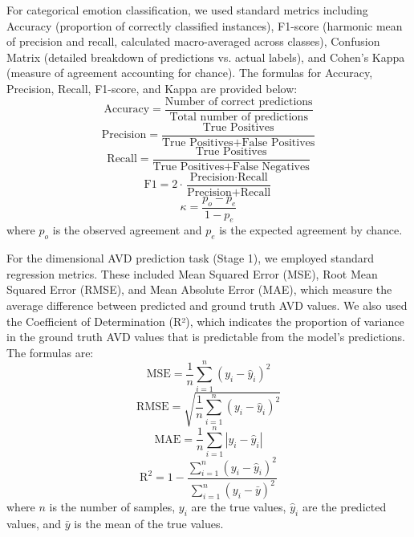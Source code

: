 \documentclass[12pt]{article}
\begin{document}
For categorical emotion classification, we used standard metrics including Accuracy (proportion of correctly classified instances), F1-score (harmonic mean of precision and recall, calculated macro-averaged across classes), Confusion Matrix (detailed breakdown of predictions vs. actual labels), and Cohen's Kappa (measure of agreement accounting for chance). The formulas for Accuracy, Precision, Recall, F1-score, and Kappa are provided below:
    \begin{equation}
        \text{Accuracy} = \frac{\text{Number of correct predictions}}{\text{Total number of predictions}}
    \end{equation}
    \begin{equation}
        \text{Precision} = \frac{\text{True Positives}}{\text{True Positives} + \text{False Positives}}
    \end{equation}
    \begin{equation}
        \text{Recall} = \frac{\text{True Positives}}{\text{True Positives} + \text{False Negatives}}
    \end{equation}
\begin{equation}
    \text{F1} = 2 \cdot \frac{\text{Precision} \cdot \text{Recall}}{\text{Precision} + \text{Recall}}
\end{equation}
    \begin{equation}
        \kappa = \frac{p_o - p_e}{1 - p_e}
    \end{equation}
    where $p_o$ is the observed agreement and $p_e$ is the expected agreement by chance.

For the dimensional AVD prediction task (Stage 1), we employed standard regression metrics. These included Mean Squared Error (MSE), Root Mean Squared Error (RMSE), and Mean Absolute Error (MAE), which measure the average difference between predicted and ground truth AVD values. We also used the Coefficient of Determination (R²), which indicates the proportion of variance in the ground truth AVD values that is predictable from the model's predictions. The formulas are:
    \begin{equation}
        \text{MSE} = \frac{1}{n} \sum_{i=1}^{n} (y_i - \hat{y}_i)^2
    \end{equation}
    \begin{equation}
        \text{RMSE} = \sqrt{\frac{1}{n} \sum_{i=1}^{n} (y_i - \hat{y}_i)^2}
    \end{equation}
    \begin{equation}
        \text{MAE} = \frac{1}{n} \sum_{i=1}^{n} |y_i - \hat{y}_i|
    \end{equation}
    \begin{equation}
        \text{R}^2 = 1 - \frac{\sum_{i=1}^{n} (y_i - \hat{y}_i)^2}{\sum_{i=1}^{n} (y_i - \bar{y})^2}
    \end{equation}
where $n$ is the number of samples, $y_i$ are the true values, $\hat{y}_i$ are the predicted values, and $\bar{y}$ is the mean of the true values.
\end{document}
